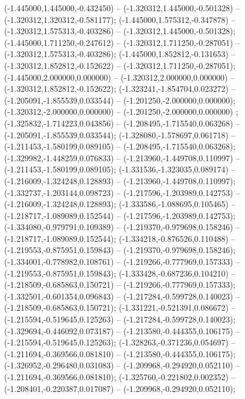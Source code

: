  (-1.445000,1.445000,-0.432450) -- (-1.320312,1.445000,-0.501328) -- (-1.320312,1.320312,-0.581177);
 (-1.445000,1.575312,-0.347878) -- (-1.320312,1.575313,-0.403286) -- (-1.320312,1.445000,-0.501328);
 (-1.445000,1.711250,-0.247612) -- (-1.320312,1.711250,-0.287051) -- (-1.320312,1.575313,-0.403286);
 (-1.445000,1.852812,-0.131653) -- (-1.320312,1.852812,-0.152622) -- (-1.320312,1.711250,-0.287051);
 (-1.445000,2.000000,0.000000) -- (-1.320312,2.000000,0.000000) -- (-1.320312,1.852812,-0.152622);
 (-1.323241,-1.854704,0.023272) -- (-1.205091,-1.855539,0.033544) -- (-1.201250,-2.000000,0.000000);
 (-1.320312,-2.000000,0.000000) -- (-1.201250,-2.000000,0.000000) ;
 (-1.325832,-1.714223,0.043856) -- (-1.208495,-1.715540,0.063268) -- (-1.205091,-1.855539,0.033544);
 (-1.328080,-1.578697,0.061718) -- (-1.211453,-1.580199,0.089105) -- (-1.208495,-1.715540,0.063268);
 (-1.329982,-1.448259,0.076833) -- (-1.213960,-1.449708,0.110997) -- (-1.211453,-1.580199,0.089105);
 (-1.331536,-1.323035,0.089174) -- (-1.216009,-1.324248,0.128893) -- (-1.213960,-1.449708,0.110997);
 (-1.332737,-1.203144,0.098723) -- (-1.217596,-1.203989,0.142753) -- (-1.216009,-1.324248,0.128893);
 (-1.333586,-1.088695,0.105465) -- (-1.218717,-1.089089,0.152544) -- (-1.217596,-1.203989,0.142753);
 (-1.334080,-0.979791,0.109389) -- (-1.219370,-0.979698,0.158246) -- (-1.218717,-1.089089,0.152544);
 (-1.334218,-0.876526,0.110488) -- (-1.219553,-0.875951,0.159843) -- (-1.219370,-0.979698,0.158246);
 (-1.334001,-0.778982,0.108761) -- (-1.219266,-0.777969,0.157333) -- (-1.219553,-0.875951,0.159843);
 (-1.333428,-0.687236,0.104210) -- (-1.218509,-0.685863,0.150721) -- (-1.219266,-0.777969,0.157333);
 (-1.332501,-0.601354,0.096843) -- (-1.217284,-0.599728,0.140023) -- (-1.218509,-0.685863,0.150721);
 (-1.331221,-0.521391,0.086672) -- (-1.215594,-0.519645,0.125263) -- (-1.217284,-0.599728,0.140023);
 (-1.329694,-0.446092,0.073187) -- (-1.213580,-0.444355,0.106175) -- (-1.215594,-0.519645,0.125263);
 (-1.328263,-0.371236,0.054697) -- (-1.211694,-0.369566,0.081810) -- (-1.213580,-0.444355,0.106175);
 (-1.326952,-0.296480,0.031083) -- (-1.209968,-0.294920,0.052110) -- (-1.211694,-0.369566,0.081810);
 (-1.325760,-0.221802,0.002352) -- (-1.208401,-0.220387,0.017087) -- (-1.209968,-0.294920,0.052110);
